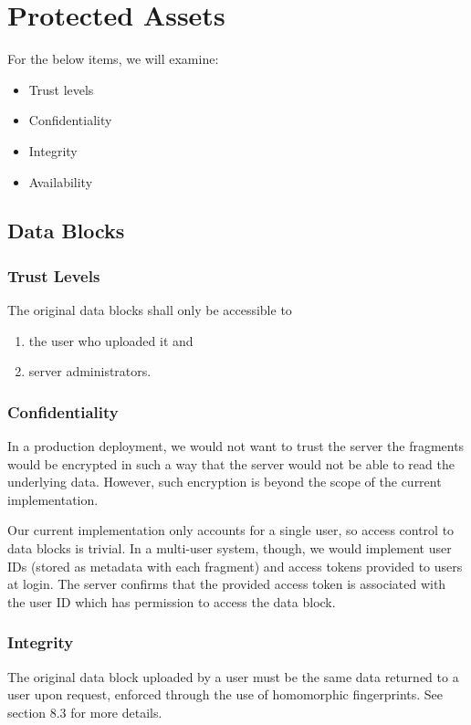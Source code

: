 \documentclass[../veristore_security_model.tex]{subfiles}
\begin{document}
\section{Protected Assets}
For the below items, we will examine:
\begin{itemize}[topsep=-0.5em]
    \item Trust levels
    \item Confidentiality
    \item Integrity
    \item Availability
\end{itemize}

\subsection{Data Blocks}
\vspace{-1em}
\subsubsection{Trust Levels}

\vspace{-1.5em}
The original data blocks shall only be accessible to
\begin{enumerate}[label=\alph*), topsep=-0.5em, noitemsep]
    \item the user who uploaded it and
    \item server administrators.
\end{enumerate}

\subsubsection{Confidentiality}
\vspace{-1.5em}
In a production deployment, we would not want to trust the server \textendash{} the fragments would be encrypted in such a way that the server would not be able to read the underlying data. However, such encryption is beyond the scope of the current implementation.

Our current implementation only accounts for a single user, so access control to data blocks is trivial. In a multi-user system, though, we would implement user IDs (stored as metadata with each fragment) and access tokens provided to users at login. The server confirms that the provided access token is associated with the user ID which has permission to access the data block.

\subsubsection{Integrity}
\vspace{-1.5em}
The original data block uploaded by a user must be the same data returned to a user upon request, enforced through the use of homomorphic fingerprints. See section 8.3 for more details.
\end{document}
